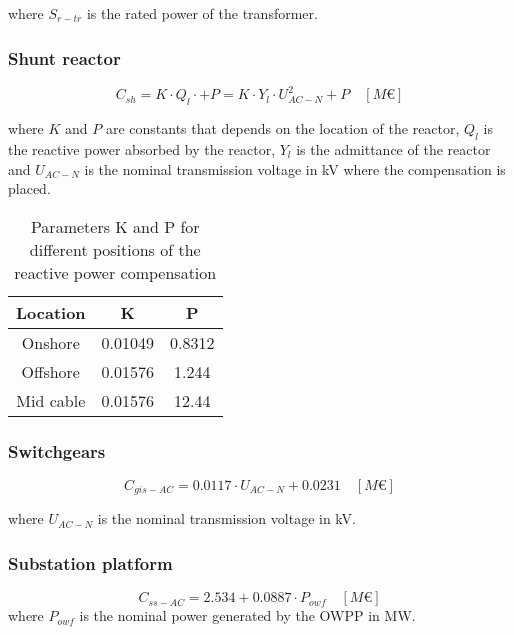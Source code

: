 \documentclass[a4paper,11pt, titlepage, twoside]{article}
\begin{document}
where $S_{r-tr}$ is the rated power of the transformer.
\subsubsection{Shunt reactor}

\begin{equation}
    C_{sh}= K \cdot Q_l \cdot + P = K \cdot Y_l\cdot U_{AC-N}^2 + P \quad \left[M\euro\right]
\end{equation}

where $K$ and $P$ are constants that depends on the location of the reactor, $Q_l$ is the reactive power absorbed by the reactor, $Y_l$ is the admittance of the reactor and $U_{AC-N}$ is the nominal transmission voltage in kV where the compensation is placed.

\begin{table}[h]
    \centering
    \begin{tabular}{c|c|c}
    \hline
    \textbf{Location} & \textbf{K} & \textbf{P} \\
    \hline
    Onshore & 0.01049 & 0.8312  \\
    Offshore & 0.01576 & 1.244 \\
    Mid cable & 0.01576 & 12.44 \\
    \hline
    \end{tabular}
    \caption{Parameters K and P for different positions of the reactive power compensation \cite{paperbase}}
    \label{tab:parametersshunt}
    \end{table}
\subsubsection{Switchgears}

\begin{equation}
    C_{gis-AC} = 0.0117 \cdot U_{AC-N} + 0.0231 \quad \left[M\euro\right]
\end{equation}

where $U_{AC-N}$ is the nominal transmission voltage in kV.
\subsubsection{Substation platform}

\begin{equation}
    C_{ss-AC} = 2.534 + 0.0887 \cdot P_{owf} \quad \left[M\euro\right]
\end{equation}
where $P_{owf}$ is the nominal power generated by the OWPP in MW.
\newpage
\end{document}
